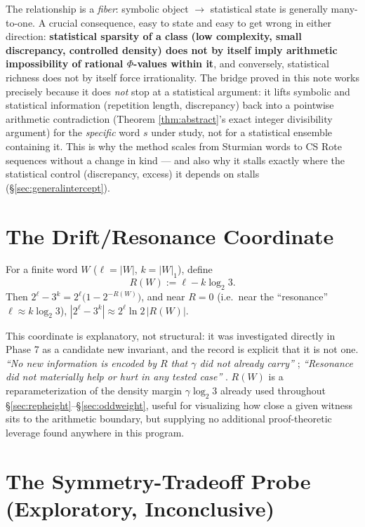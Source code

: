 \documentclass[11pt]{article}
\begin{document}
The relationship is a \emph{fiber}: symbolic object $\to$ statistical state is generally many-to-one. A crucial consequence, easy to state and easy to get wrong in either direction: \textbf{statistical sparsity of a class (low complexity, small discrepancy, controlled density) does not by itself imply arithmetic impossibility of rational $\Phi$-values within it}, and conversely, statistical richness does not by itself force irrationality. The bridge proved in this note works precisely because it does \emph{not} stop at a statistical argument: it lifts symbolic and statistical information (repetition length, discrepancy) back into a pointwise arithmetic contradiction (Theorem \ref{thm:abstract}'s exact integer divisibility argument) for the \emph{specific} word $s$ under study, not for a statistical ensemble containing it. This is why the method scales from Sturmian words to CS Rote sequences without a change in kind --- and also why it stalls exactly where the statistical control (discrepancy, excess) it depends on stalls (\S\ref{sec:generalintercept}).

\section{The Drift/Resonance Coordinate}
\label{sec:drift}

For a finite word $W$ ($\ell=|W|$, $k=|W|_1$), define
\[
R(W) := \ell - k\log_2 3.
\]
Then $2^\ell - 3^k = 2^\ell\bigl(1-2^{-R(W)}\bigr)$, and near $R=0$ (i.e.\ near the ``resonance'' $\ell\approx k\log_2 3$), $|2^\ell-3^k| \approx 2^\ell \ln2\,|R(W)|$.

This coordinate is explanatory, not structural: it was investigated directly in Phase 7 as a candidate new invariant, and the record is explicit that it is not one. \emph{``No new information is encoded by $R$ that $\gamma$ did not already carry''} \cite{Phase7Drift}; \emph{``Resonance did not materially help or hurt in any tested case''} \cite{Phase7DriftDigits}. $R(W)$ is a reparameterization of the density margin $\gamma\log_2 3$ already used throughout \S\ref{sec:repheight}--\S\ref{sec:oddweight}, useful for visualizing how close a given witness sits to the arithmetic boundary, but supplying no additional proof-theoretic leverage found anywhere in this program.

\section{The Symmetry-Tradeoff Probe (Exploratory, Inconclusive)}
\label{sec:symmetryprobe}
\end{document}

